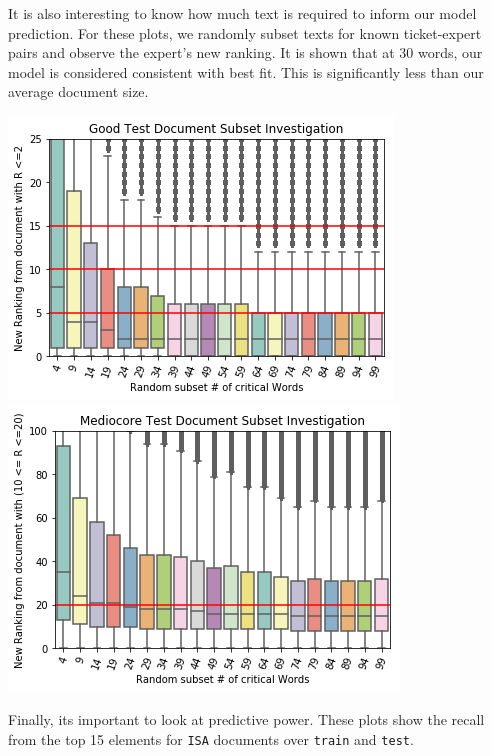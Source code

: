\documentclass{article}
\begin{document}
\begin{multicols}{2}
It is also interesting to know how much text is required to inform
our model prediction. For these plots, we randomly subset texts for
known ticket-expert pairs and observe the expert's new ranking. It is
shown that at 30 words, our model is considered consistent with best fit.
This is significantly less than our average document size.

\includegraphics[width=\columnwidth]{../images/low-ranked-downsample.png}
\includegraphics[width=\columnwidth]{../images/mid-ranked-downsample.png}

Finally, its important to look at predictive power. These plots show the
recall from the top 15 elements for \texttt{ISA} documents over \texttt{train}
and \texttt{test}.


\end{multicols}
\end{document}
